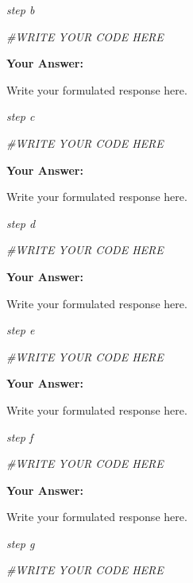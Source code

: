 \documentclass[
]{article}
\newenvironment{Shaded}{\begin{snugshade}}{\end{snugshade}}
\newcommand{\CommentTok}[1]{\textcolor[rgb]{0.56,0.35,0.01}{\textit{#1}}}
\begin{document}
\emph{step b}

\begin{Shaded}
\begin{Highlighting}[]
\CommentTok{\#WRITE YOUR CODE HERE}
\end{Highlighting}
\end{Shaded}

\textbf{Your Answer:}

Write your formulated response here.

\emph{step c}

\begin{Shaded}
\begin{Highlighting}[]
\CommentTok{\#WRITE YOUR CODE HERE}
\end{Highlighting}
\end{Shaded}

\textbf{Your Answer:}

Write your formulated response here.

\emph{step d}

\begin{Shaded}
\begin{Highlighting}[]
\CommentTok{\#WRITE YOUR CODE HERE}
\end{Highlighting}
\end{Shaded}

\textbf{Your Answer:}

Write your formulated response here.

\emph{step e}

\begin{Shaded}
\begin{Highlighting}[]
\CommentTok{\#WRITE YOUR CODE HERE}
\end{Highlighting}
\end{Shaded}

\textbf{Your Answer:}

Write your formulated response here.

\emph{step f}

\begin{Shaded}
\begin{Highlighting}[]
\CommentTok{\#WRITE YOUR CODE HERE}
\end{Highlighting}
\end{Shaded}

\textbf{Your Answer:}

Write your formulated response here.

\emph{step g}

\begin{Shaded}
\begin{Highlighting}[]
\CommentTok{\#WRITE YOUR CODE HERE}
\end{Highlighting}
\end{Shaded}
\end{document}
